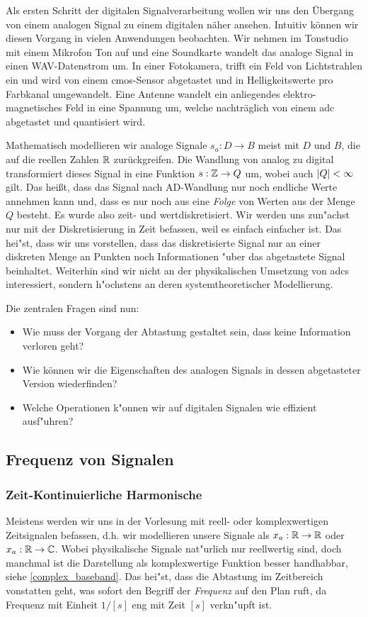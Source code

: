 %
Als ersten Schritt der digitalen Signalverarbeitung wollen wir uns den \"Ubergang von einem analogen Signal zu einem digitalen n\"aher ansehen.
Intuitiv k\"onnen wir diesen Vorgang in vielen Anwendungen beobachten.
Wir nehmen im Tonstudio mit einem Mikrofon Ton auf und eine Soundkarte wandelt das analoge Signal in einen WAV-Datenstrom um.
In einer Fotokamera, trifft ein Feld von Lichtstrahlen ein und wird von einem \gls{cmos}-Sensor  abgetastet und in Helligkeitswerte pro Farbkanal umgewandelt.
Eine Antenne wandelt ein anliegendes elektro-magnetisches Feld in eine Spannung um, welche nachtr\"aglich von einem \gls{adc} abgetastet und quantisiert wird.

Mathematisch modellieren wir analoge Signale $s_a : D \rightarrow B$ meist mit $D$ und $B$, die auf die reellen Zahlen $\mathbb{R}$ zur\"uckgreifen.
Die Wandlung von analog zu digital transformiert dieses Signal in eine Funktion $s: \mathbb{Z} \rightarrow Q$ um, wobei auch ${\left| Q \right|} < \infty$ gilt.
Das hei\ss{}t, dass das Signal nach AD-Wandlung nur noch endliche Werte annehmen kann und, dass es nur noch aus eine \emph{Folge} von Werten aus der Menge $Q$ besteht. 
Es wurde also zeit- und wertdiskretisiert.
Wir werden uns zun"achst nur mit der Diskretisierung in Zeit befassen, weil es einfach einfacher ist.
Das hei"st, dass wir uns vorstellen, dass das diskretisierte Signal nur an einer diskreten Menge an Punkten noch Informationen "uber das abgetastete Signal beinhaltet.
Weiterhin sind wir nicht an der physikalischen Umsetzung von \glspl{adc} interessiert, sondern h"ochstens an deren systemtheoretischer Modellierung.

Die zentralen Fragen sind nun:
\begin{itemize}
    \item Wie muss der Vorgang der Abtastung gestaltet sein, dass keine Information verloren geht?
    \item Wie k\"onnen wir die Eigenschaften des analogen Signals in dessen abgetasteter Version wiederfinden?
    \item Welche Operationen k"onnen wir auf digitalen Signalen wie effizient ausf"uhren?
\end{itemize}
%
\subsection{Frequenz von Signalen}
%
\subsubsection{Zeit-Kontinuierliche Harmonische}
%
Meistens werden wir uns in der Vorlesung mit reell- oder komplexwertigen Zeitsignalen befassen, d.h. wir modellieren unsere Signale als $x_a : \mathbb{R} \rightarrow \mathbb{R}$ oder $x_a: \mathbb{R} \rightarrow \mathbb{C}$.
Wobei physikalische Signale nat"urlich nur reellwertig sind, doch manchmal ist die Darstellung als komplexwertige Funktion besser handhabbar, siehe \eqref{complex_baseband}.
Das hei"st, dass die Abtastung im Zeitbereich vonstatten geht, was sofort den Begriff der \emph{Frequenz} auf den Plan ruft, da Frequenz mit Einheit $1/[s]$ eng mit Zeit $[s]$ verkn"upft ist.

